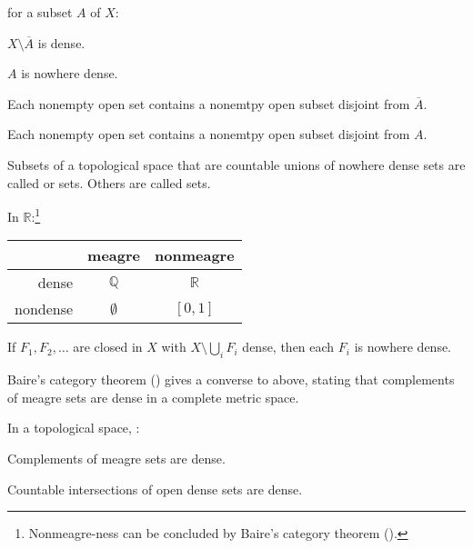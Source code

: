 	\begin{cor}\label{COR: characterizing nowhere dense}
		\Tfae for a subset $A$ of $X$:
		\begin{mylist}
			\item $X\setminus \overline A$ is dense.
			
			\item $A$ is nowhere dense.
			
			\item Each nonempty open set contains a nonemtpy open subset disjoint from $\overline A$.
			
			\item Each nonempty open set contains a nonemtpy open subset disjoint from $A$.
		\end{mylist}
	\end{cor}
	
	Subsets of a topological space that are countable unions of nowhere dense sets are called  or  sets. Others are called  sets.
	
	\begin{rmk}
		In $\mathbb R$:\footnote{Nonmeagre-ness can be concluded by Baire's category theorem ().}
		\begin{center}
			\begin{tabular}{r|cc}
				& meagre & nonmeagre\\
				\hline
				dense & $\mathbb Q$ & $\mathbb R$\\
				nondense & $\emptyset$ & $[0, 1]$
			\end{tabular}
		\end{center}
	\end{rmk}
	
	\begin{lem}
		If $F_1, F_2, \ldots$ are closed in $X$ with $X\setminus\bigcup_i F_i$ dense, then each $F_i$ is nowhere dense.
	\end{lem}
	
	\begin{rmk}
		Baire's category theorem () gives a converse to above, stating that complements of meagre sets are dense in a complete metric space.
	\end{rmk}
	
	\begin{prp}\label{PRP: versions of BCT}
		In a topological space, \tfae:
		\begin{mylist}
			\item\label{PRPi: versions of BCT} Complements of meagre sets are dense.
			\item\label{PRPii: versions of BCT} Countable intersections of open dense sets are dense.
		\end{mylist}
	\end{prp}
	
